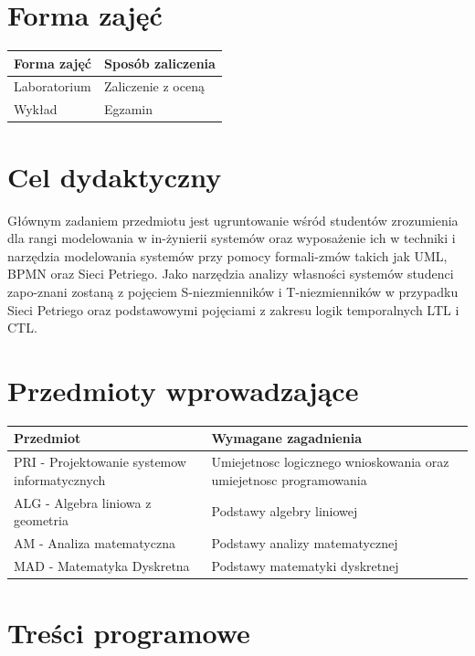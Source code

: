 \documentclass[12pt, a4paper]{article}
\begin{document}
\section{Forma zajęć}

\begin{tabular}{ll}
  \hline
  \textbf{Forma zajęć} & \textbf{Sposób zaliczenia} \\
  \hline
  Laboratorium & Zaliczenie z oceną \\
  Wykład & Egzamin \\
  \hline
\end{tabular}

\section{Cel dydaktyczny}

Głównym zadaniem przedmiotu jest ugruntowanie wśród studentów zrozumienia dla rangi modelowania w in-żynierii systemów oraz wyposażenie ich w techniki i narzędzia modelowania systemów przy pomocy formali-zmów takich jak UML, BPMN oraz Sieci Petriego. Jako narzędzia analizy własności systemów studenci zapo-znani zostaną z pojęciem S-niezmienników i T-niezmienników w przypadku Sieci Petriego oraz podstawowymi pojęciami z zakresu logik temporalnych LTL i CTL.

\section{Przedmioty wprowadzające}

\begin{tabularx}{\textwidth}{lX}
  \hline
  \textbf{Przedmiot} & \textbf{Wymagane zagadnienia} \\
  \hline
  PRI - Projektowanie systemow informatycznych & Umiejetnosc logicznego wnioskowania oraz umiejetnosc programowania \\
  ALG - Algebra liniowa z geometria & Podstawy algebry liniowej \\
  AM - Analiza matematyczna & Podstawy analizy matematycznej \\
  MAD - Matematyka Dyskretna & Podstawy matematyki dyskretnej \\
  \hline
\end{tabularx}

\section{Treści programowe}
\end{document}
